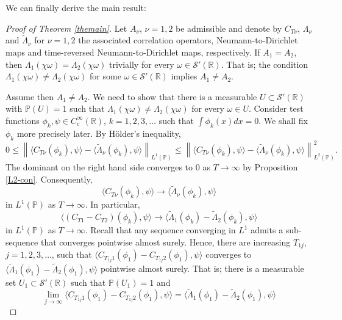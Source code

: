 \documentclass[10pt,a4paper]{article}
\theoremstyle{plain}
\theoremstyle{definition}
\theoremstyle{remark}
\numberwithin{equation}{section}
\newcommand{\R}{\mathbb{R}}
\begin{document}
We can finally derive the main result:
\begin{proof}[Proof of Theorem \ref{themain}]
Let $A_\nu$, $\nu=1,2$ be admissible and denote by 
 $C_{T\nu} $, $\Lambda_{\nu} $ and $\tilde\Lambda_{\nu} $ for $\nu=1,2$ the associated correlation operators, Neumann-to-Dirichlet maps and time-reversed Neumann-to-Dirichlet maps, respectively.
If $A_1 = A_2$, then $\Lambda_{1} (\chi \omega) = \Lambda_{2} (\chi \omega) $ trivially for every $ \omega \in \mathcal{S}'(\R)$. 
That is; the condition $\Lambda_{1}(\chi \omega) \neq \Lambda_{2}(\chi \omega)$ for some $\omega \in \mathcal{S}'(\R)$ implies $A_1 \neq A_2$. 


Assume then $A_1 \neq A_2$. We need to show that there is a measurable $U \subset \mathcal{S}'(\R)$  with $\mathbb{P}(U) = 1$ such that $\Lambda_{1}(\chi \omega) \neq \Lambda_{2}(\chi \omega)$ for every $\omega \in U$.  
Consider test functions $\phi_k, \psi \in C^\infty_c (\R)$, $k =1,2,3,\dots$ such that $\int \phi_k (x) dx = 0$. We shall fix $\phi_k$ more precisely later. 
 By Hölder's inequality, 
 \[
0\leq   \left\|  \langle C_{T\nu}(\phi_k) , \psi \rangle  - \langle \tilde\Lambda_{\nu } (\phi_k ), \psi \rangle  \right\|_{L^1(\mathbb{P})} \leq \left\|  \langle C_{T\nu}(\phi_k) , \psi \rangle  - \langle \tilde\Lambda_{ \nu} (\phi_k ), \psi \rangle  \right\|_{L^2(\mathbb{P})}^2 .
 \]
The dominant on the right hand side converges to $0$ as $T \to \infty$ by Proposition \ref{L2-con}. 
Consequently, 
\[
\langle C_{T\nu} (\phi_k) , \psi \rangle  \to  \langle \tilde\Lambda_{ \nu} (\phi_k ), \psi \rangle 
\]
in $L^1 ( \mathbb{P})$ as $T \to \infty$. 
In particular, 
\[
\langle (C_{T1} - C_{T2}) (\phi_k) , \psi \rangle  \to  \langle \tilde\Lambda_{ 1} (\phi_k )-  \tilde\Lambda_{ 2} (\phi_k ), \psi \rangle 
\]
in $L^1 ( \mathbb{P})$ as $T \to \infty$. 
Recall that any sequence converging in $L^1 $ admits a sub-sequence that converges pointwise almost surely. 
Hence, there are increasing $T_{1j} $, $j=1,2,3,\dots$, such that  $\langle C_{T_{1j}1}(\phi_1)-C_{T_{1j}2}(\phi_1)  , \psi \rangle$ converges to $ \langle \tilde\Lambda_{1} (\phi_1 )-\tilde\Lambda_{2} (\phi_1 ), \psi \rangle$ pointwise almost surely. 
That is; there is a measurable set $U_1 \subset \mathcal{S}'(\R)$ such that $\mathbb{P} (U_1) = 1$ and 
\begin{equation}\label{eqp:991221}
\lim_{j \to \infty} \langle C_{T_{1j}1}(\phi_1)-C_{T_{1j}2}(\phi_1)  , \psi \rangle =  \langle \tilde\Lambda_{1} (\phi_1 )-\tilde\Lambda_{2} (\phi_1 ), \psi \rangle
\end{equation}

\end{proof}
\end{document}
